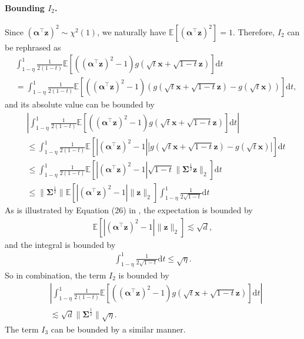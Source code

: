 \paragraph{Bounding $I_2$.} Since $(\bm{\alpha}^\top \bm{z})^2 \sim \chi^2(1)$, we naturally have $\mathbb{E}[(\bm{\alpha}^\top \bm{z})^2] = 1$. Therefore, $I_2$ can be rephrased as
\begin{align*}
&\int_{1-\eta}^1 \frac{1}{2(1-t)}\mathbb{E}\left[((\bm{\alpha}^\top \bm{z})^2 -1)g(\sqrt{t}\bm{x}+\sqrt{1-t}\bm{z})\right] \mathrm{d}t\\ 
&= \int_{1-\eta}^1 \frac{1}{2(1-t)}\mathbb{E}\left[((\bm{\alpha}^\top \bm{z})^2 -1)\left(g(\sqrt{t}\bm{x}+\sqrt{1-t}\bm{z})-g(\sqrt{t}\bm{x})\right)\right] \mathrm{d}t,
\end{align*}
and its absolute value can be bounded by
\begin{align*}
&\left|\int_{1-\eta}^1 \frac{1}{2(1-t)}\mathbb{E}\left[((\bm{\alpha}^\top \bm{z})^2 -1)g(\sqrt{t}\bm{x}+\sqrt{1-t}\bm{z})\right] \mathrm{d}t\right| \\ 
&\leq \int_{1-\eta}^1 \frac{1}{2(1-t)}\mathbb{E}\left[|(\bm{\alpha}^\top \bm{z})^2 -1|\left|g(\sqrt{t}\bm{x}+\sqrt{1-t}\bm{z})-g(\sqrt{t}\bm{x})\right|\right] \mathrm{d}t \\ 
&\leq \int_{1-\eta}^1 \frac{1}{2(1-t)}\mathbb{E}\left[|(\bm{\alpha}^\top \bm{z})^2 -1| \sqrt{1-t}\|\bm{\Sigma}^{\frac{1}{2}}\bm{z}\|_2\right] \mathrm{d}t \\ 
&\leq \|\bm{\Sigma}^{\frac{1}{2}}\| \mathbb{E}[|(\bm{\alpha}^\top \bm{z})^2 -1|\|\bm{z}\|_2] \int_{1-\eta}^1 \frac{1}{2\sqrt{1-t}}\mathrm{d}t
\end{align*}
As is illustrated by Equation (26) in \cite{gallouet2018regularity}, the expectation is bounded by
\begin{align*}
\mathbb{E}[|(\bm{\alpha}^\top \bm{z})^2 -1|\|\bm{z}\|_2] \lesssim \sqrt{d},
\end{align*}
and the integral is bounded by
\begin{align*}
\int_{1-\eta}^1 \frac{1}{2\sqrt{1-t}}\mathrm{d}t \leq \sqrt{\eta}.
\end{align*}
So in combination, the term $I_2$ is bounded by
\begin{align}\label{eq:Stein-smooth-I2}
&\left|\int_{1-\eta}^1 \frac{1}{2(1-t)}\mathbb{E}\left[((\bm{\alpha}^\top \bm{z})^2 -1)g(\sqrt{t}\bm{x}+\sqrt{1-t}\bm{z})\right] \mathrm{d}t\right| \\ 
&\lesssim \sqrt{d}\|\bm{\Sigma}^{\frac{1}{2}}\| \sqrt{\eta}.
\end{align}
The term $I_3$ can be bounded by a similar manner.

